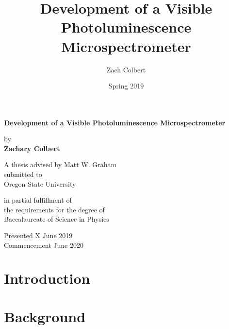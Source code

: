 \documentclass{report}
\title{Development of a Visible Photoluminescence Microspectrometer}
\author{Zach Colbert}
\date{Spring 2019}
\renewenvironment{abstract}
 {%
  \global\setbox\abstractbox=\vtop\bgroup
  \begin{center}\bfseries\abstractname\end{center}%
 }
 {\par\egroup}
\begin{document}

  \begin{titlepage}
    \begin{center}
        \vspace*{1cm}
  
        \textbf{Development of a Visible Photoluminescence Microspectrometer}
  
        \vspace{1.5cm}
  
        by \\
        \textbf{Zachary Colbert}
  
        \vspace{5cm}
  
        A thesis advised by Matt W. Graham \\
        submitted to \\
        Oregon State University

        \vspace{1.5cm}

        in partial fulfillment of \\
        the requirements for the degree of \\
        Baccalaureate of Science in Physics
  
        \vfill
  
        Presented X June 2019 \\
        Commencement June 2020
  
    \end{center}
  \end{titlepage}

  

  \tableofcontents
  \listoffigures


  \chapter{Introduction}
  

  \chapter{Background}
  
\end{document}
